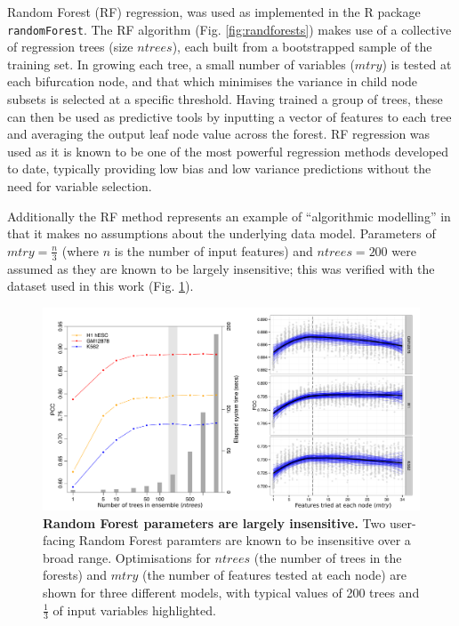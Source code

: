 \documentclass[a4paper,11pt,oneside]{book}
\begin{document}
Random Forest (RF) regression,\cite{Breiman2001a}  was used
as implemented in the R package \texttt{randomForest}.\cite{Liaw2002}
The RF algorithm (Fig. \ref{fig:randforests}) makes use of a collective of regression trees (size $ntrees$), each built from a
bootstrapped sample of the training set. In growing each tree, a small
number of variables ($mtry$) is tested at each bifurcation node, and that which minimises the
variance in child node subsets is selected at a specific
threshold. Having trained a group of trees, these can then be used as
predictive tools by inputting a vector of features to each tree and
averaging the output leaf node value across the forest. RF regression
was used as it is known to be one of the most powerful regression
methods developed to date,\cite{Svetnik2003, Cutler2007} typically
providing low bias and low variance predictions without the need for
variable selection.\cite{Diaz2006, Dasgupta2012}

Additionally the RF method represents an example of ``algorithmic
modelling''\cite{Breiman2001b} in that it makes no assumptions about the
underlying data model.
Parameters of $mtry = \frac{n}{3}$ (where $n$ is the number of input features) and $ntrees =
200$ were assumed as they are known to be
largely insensitive;\cite{Dasgupta2012, Hastie2001} this was verified
with the dataset used in this work (Fig. \ref{fig:rfparam}). 

\begin{figure}
\begin{center}
\includegraphics[width=5in]{figs/rfparams.pdf}
\captionsetup{width=\textwidth}
\caption[Random Forest parameters are largely insensitive.]{ {\bf Random Forest parameters are largely insensitive. } 
Two user-facing Random Forest paramters are known to be insensitive over a broad range.\cite{Hastie2001} Optimisations for $ntrees$ (the number of trees in the forests) and $mtry$ (the number of features tested at each node) are shown for three different models, with typical values of 200 trees and $\frac{1}{3}$ of input variables highlighted.
}\label{fig:rfparam}
\end{center}
\end{figure} 
\end{document}

